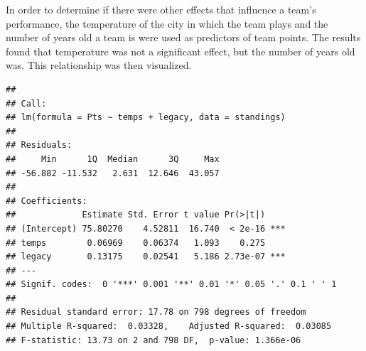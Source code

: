 \documentclass[]{article}
\newenvironment{Shaded}{\begin{snugshade}}{\end{snugshade}}
\newcommand{\CommentTok}[1]{\textcolor[rgb]{0.56,0.35,0.01}{\textit{#1}}}
\newcommand{\ControlFlowTok}[1]{\textcolor[rgb]{0.13,0.29,0.53}{\textbf{#1}}}
\newcommand{\DataTypeTok}[1]{\textcolor[rgb]{0.13,0.29,0.53}{#1}}
\newcommand{\DecValTok}[1]{\textcolor[rgb]{0.00,0.00,0.81}{#1}}
\newcommand{\KeywordTok}[1]{\textcolor[rgb]{0.13,0.29,0.53}{\textbf{#1}}}
\newcommand{\NormalTok}[1]{#1}
\newcommand{\OperatorTok}[1]{\textcolor[rgb]{0.81,0.36,0.00}{\textbf{#1}}}
\newcommand{\StringTok}[1]{\textcolor[rgb]{0.31,0.60,0.02}{#1}}
\begin{document}
In order to determine if there were other effects that influence a
team's performance, the temperature of the city in which the team plays
and the number of years old a team is were used as predictors of team
points. The results found that temperature was not a significant effect,
but the number of years old was. This relationship was then visualized.

\begin{Shaded}
\end{Shaded}

\begin{verbatim}
## 
## Call:
## lm(formula = Pts ~ temps + legacy, data = standings)
## 
## Residuals:
##     Min      1Q  Median      3Q     Max 
## -56.882 -11.532   2.631  12.646  43.057 
## 
## Coefficients:
##             Estimate Std. Error t value Pr(>|t|)    
## (Intercept) 75.80270    4.52811  16.740  < 2e-16 ***
## temps        0.06969    0.06374   1.093    0.275    
## legacy       0.13175    0.02541   5.186 2.73e-07 ***
## ---
## Signif. codes:  0 '***' 0.001 '**' 0.01 '*' 0.05 '.' 0.1 ' ' 1
## 
## Residual standard error: 17.78 on 798 degrees of freedom
## Multiple R-squared:  0.03328,    Adjusted R-squared:  0.03085 
## F-statistic: 13.73 on 2 and 798 DF,  p-value: 1.366e-06
\end{verbatim}
\end{document}
